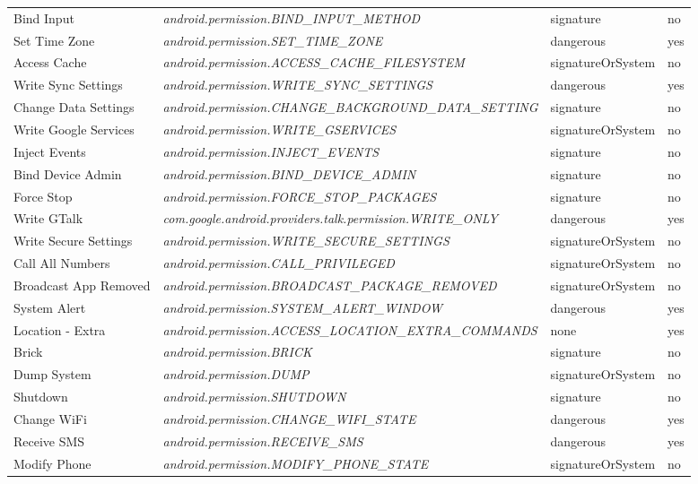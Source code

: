 \begin{small}
\begin{longtable}{p{3cm}|p{8cm}|p{2.5cm}|p{1.5cm}}
Bind Input & \textit{android.permission.\-BIND\_INPUT\_METHOD} & signature & no \\
Set Time Zone & \textit{android.permission.\-SET\_TIME\_ZONE} & dangerous & yes \\
Access Cache & \textit{android.permission.\-ACCESS\_CACHE\_FILESYSTEM} & signatureOrSystem & no \\
Write Sync Settings & \textit{android.permission.\-WRITE\_SYNC\_SETTINGS} & dangerous & yes \\
Change Data Settings & \textit{android.permission.\-CHANGE\_BACKGROUND\_DATA\_SETTING} & signature & no \\
Write Google Services & \textit{android.permission.\-WRITE\_GSERVICES} & signatureOrSystem & no \\
Inject Events & \textit{android.permission.\-INJECT\_EVENTS} & signature & no \\
Bind Device Admin & \textit{android.permission.\-BIND\_DEVICE\_ADMIN} & signature & no \\
Force Stop & \textit{android.permission.\-FORCE\_STOP\_PACKAGES} & signature & no \\
Write GTalk & \textit{com.google.android.providers.talk.permission.\-WRITE\_ONLY} & dangerous & yes \\
Write Secure Settings & \textit{android.permission.\-WRITE\_SECURE\_SETTINGS} & signatureOrSystem & no \\
Call All Numbers & \textit{android.permission.\-CALL\_PRIVILEGED} & signatureOrSystem & no \\
Broadcast App Removed & \textit{android.permission.\-BROADCAST\_PACKAGE\_REMOVED} & signatureOrSystem & no \\
System Alert & \textit{android.permission.\-SYSTEM\_ALERT\_WINDOW} & dangerous & yes \\
Location - Extra & \textit{android.permission.\-ACCESS\_LOCATION\_EXTRA\_COMMANDS} & none & yes \\
Brick & \textit{android.permission.\-BRICK} & signature & no \\
Dump System & \textit{android.permission.\-DUMP} & signatureOrSystem & no \\
Shutdown & \textit{android.permission.\-SHUTDOWN} & signature & no \\
Change WiFi & \textit{android.permission.\-CHANGE\_WIFI\_STATE} & dangerous & yes \\
Receive SMS & \textit{android.permission.\-RECEIVE\_SMS} & dangerous & yes \\
Modify Phone & \textit{android.permission.\-MODIFY\_PHONE\_STATE} & signatureOrSystem & no \\

\end{longtable}
\end{small}
